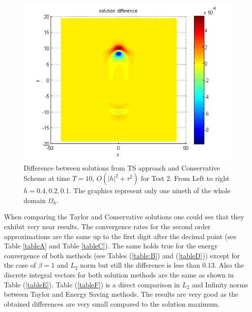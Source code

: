 \documentclass[%
 aip,
cp,  %
 amsmath,amssymb,%
 reprint,%
]{revtex4-2}
\newcommand{\rf}[1]{(\ref{#1})}
\begin{document}
\begin{figure}[ht]
\begin{minipage}[b]{0.32\linewidth}
		\includegraphics[width=\linewidth]{figures/compare_128_bt1_c09_h010.png}		 
	\end{minipage}
\caption{Difference between solutions from TS approach and Conservative Scheme at time $T=10$, $O(|h|^2 + \tau^2)$ for Test 2. From Left to right $h=0.4, 0.2, 0.1$. The graphics represent only one nineth of the whole domain $\Omega_h$.}
\label{Test2_Diff}
\end{figure}

When comparing the Taylor and Conservative solutions one could see that they exhibit very near results. The convergence rates for the second order approximations are the same up to the first digit after the decimal point (see Table \ref{tableA} and Table \ref{tableC}). The same holds true for the energy convergence of both methods (see Tables \rf{table:B} and  \rf{tableD}) except for the case of $\beta = 1$ and $L_2$ norm but still the difference is less than $0.13$. Also the discrete integral vectors for both solution methods are the same as shown in Table \rf{tableE}. Table \rf{tableF} is a direct comparison in $L_2$ and Infinity norms between Taylor and Energy Saving methods. The results are very good as the obtained differences are very small compared to the solution maximum.
\end{document}
